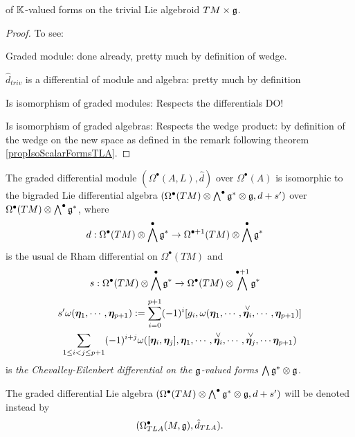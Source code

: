 \begin{theorem}\label{theoIsoScalarFormsTLA}
 of $\mathbb{K}$-valued forms on the trivial Lie algebroid $TM \times \mathfrak{g}$.
\end{theorem}

\begin{proof}
To see:

Graded module: done already, pretty much by definition of wedge.

$\hat d_{triv}$ is a differential of module and algebra: pretty much by definition

Is isomorphism of graded modules: Respects the differentials DO!

Is isomorphism of graded algebras: Respects the wedge product: by definition of the wedge on the new space as defined in the remark following theorem \ref{propIsoScalarFormsTLA}.
\end{proof}

\linea

\begin{theorem}
The graded differential module $(\Omega^\bullet(A, L), \hat d)$ over $\Omega^\bullet(A)$ is isomorphic to the bigraded Lie differential algebra $(\Omega^\bullet(TM) \otimes \bigwedge^\bullet \mathfrak{g}^* \otimes \mathfrak{g}, d + s')$ over $\Omega^\bullet(TM)\otimes \bigwedge^\bullet \mathfrak{g}^*$, where
\begin{align}
    d: \Omega^\bullet(TM) \otimes \bigwedge^\bullet \mathfrak{g}^* &\to \Omega^{\bullet+1}(TM) \otimes \bigwedge^\bullet \mathfrak{g}^*
\end{align}
is the usual de Rham differential on $\Omega^\bullet(TM)$ and
\begin{align*}
    s: \Omega^\bullet(TM) \otimes \bigwedge^\bullet \mathfrak{g}^* &\to \Omega^\bullet(TM) \otimes \bigwedge^{\bullet+1} \mathfrak{g}^*
\end{align*}
\begin{multline}
    s'\omega(\bm{\eta}_1, \cdots, \bm{\eta}_{p+1}) := \sum_{i = 0}^{p+1} (-1)^i [g_i, \omega(\bm{\eta}_1, \cdots, \overset{\vee}{\bm{\eta}_i}, \cdots, \bm{\eta}_{p+1})] \\
    \sum_{1 \leq i < j \leq p+1} (-1)^{i+j} \omega([\bm{\eta}_i, \bm{\eta}_j], \bm{\eta}_1, \cdots, \overset{\vee}{\bm{\eta}_i}, \cdots, \overset{\vee}{\bm{\eta}_j}, \cdots \bm{\eta}_{p+1})
\end{multline}
is \emph{the Chevalley-Eilenbert differential on the $\mathfrak{g}$-valued forms $\bigwedge \mathfrak{g}^* \otimes \mathfrak{g}$}. 

The graded differential Lie algebra $(\Omega^\bullet(TM) \otimes \bigwedge^\bullet \mathfrak{g}^* \otimes \mathfrak{g}, d + s')$ will be denoted instead by
\begin{align}
    (\Omega^\bullet_{TLA}(M, \mathfrak{g}), \hat d_{TLA}).
\end{align}
\end{theorem}

